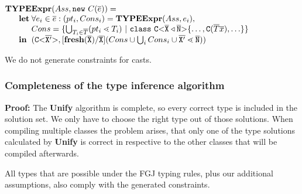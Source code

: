 \documentclass[runningheads]{llncs}
\begin{document}
$\begin{array}{@{}l@{}l@{}l}
\textbf{TY}& \textbf{PE} & \textbf{Expr} (Ass, \mathtt{new }\ C(\overline{e}) ) = \\
& \textbf{let} %
& \forall e_i \in \overline{e} : (pt_i, Cons_i) = \textbf{TYPEExpr}(Ass, e_i)  ,\\
& & Cons = \{ \bigcup_{T_i \in \overline{T}} (pt_i \lessdot T_i) \ | \ \mathtt{class }\ \exptype{C}{\ol{X} \triangleleft \ol{N}}\{ \ldots, \texttt{C}(\overline{T} \overline{x}), \ldots \} \}\\
& \mathbf{in}%
& (\exptype{C}{\ol{X'}}, [\textbf{fresh}(\ol{X})/\ol{X}](Cons \cup \bigcup_i Cons_i \cup \ol{X'} \lessdot \ol{N}))\\
\end{array}
$

We do not generate constraints for casts.

\subsubsection{Completeness of the type inference algorithm}
\textbf{Proof:} The \textbf{Unify} algorithm is complete, so every correct type is included in the solution set.
We only have to choose the right type out of those solutions.
When compiling multiple classes the problem arises,
that only one of the type solutions calculated by \textbf{Unify} is correct
in respective to the other classes that will be compiled afterwards.

All types that are possible under the FGJ typing rules, plus our additional assumptions,
also comply with the generated constraints.
\end{document}
